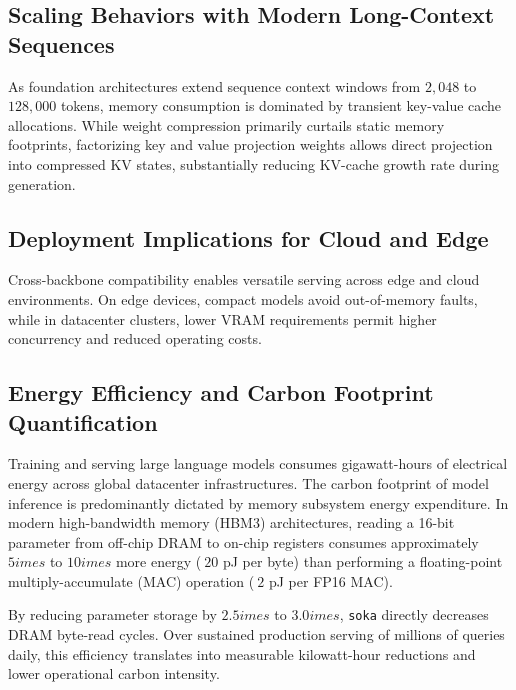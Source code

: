 \subsection{Scaling Behaviors with Modern Long-Context Sequences}
As foundation architectures extend sequence context windows from $2{,}048$ to $128{,}000$ tokens, memory consumption is dominated by transient key-value cache allocations. While weight compression primarily curtails static memory footprints, factorizing key and value projection weights allows direct projection into compressed KV states, substantially reducing KV-cache growth rate during generation.

\subsection{Deployment Implications for Cloud and Edge}
Cross-backbone compatibility enables versatile serving across edge and cloud environments. On edge devices, compact models avoid out-of-memory faults, while in datacenter clusters, lower VRAM requirements permit higher concurrency and reduced operating costs.

\subsection{Energy Efficiency and Carbon Footprint Quantification}
Training and serving large language models consumes gigawatt-hours of electrical energy across global datacenter infrastructures. The carbon footprint of model inference is predominantly dictated by memory subsystem energy expenditure. In modern high-bandwidth memory (HBM3) architectures, reading a 16-bit parameter from off-chip DRAM to on-chip registers consumes approximately $5	imes$ to $10	imes$ more energy ($~20$ pJ per byte) than performing a floating-point multiply-accumulate (MAC) operation ($~2$ pJ per FP16 MAC).

By reducing parameter storage by $2.5	imes$ to $3.0	imes$, \texttt{soka} directly decreases DRAM byte-read cycles. Over sustained production serving of millions of queries daily, this efficiency translates into measurable kilowatt-hour reductions and lower operational carbon intensity.
